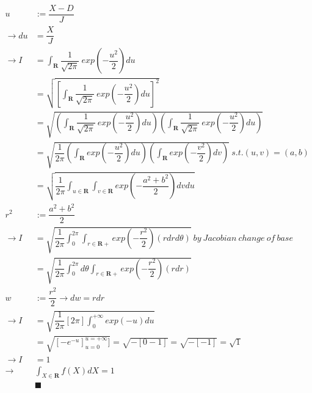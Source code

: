\documentclass[]{article}
\begin{document}
			\begin{align*}
				u &:= \dfrac{X-D}{J} \\
				\to du &= \dfrac{X}{J} \\
				\to I &=\int_\mathbf{R} \dfrac{1}{\sqrt{2\pi}}\ exp(-\dfrac{u^2}{2})du \\
				&= \sqrt{[\int_\mathbf{R} \dfrac{1}{\sqrt{2\pi}}\ exp(-\dfrac{u^2}{2})du]^2} \\
				&= \sqrt{(\int_\mathbf{R} \dfrac{1}{\sqrt{2\pi}}\ exp(-\dfrac{u^2}{2})du)(\int_\mathbf{R} \dfrac{1}{\sqrt{2\pi}}\ exp(-\dfrac{u^2}{2})du)} \\
				&= \sqrt{\dfrac{1}{2\pi}(\int_\mathbf{R}exp(-\dfrac{u^2}{2})du)(\int_\mathbf{R}exp(-\dfrac{v^2}{2})dv)}\ s.t. (u,v)=(a,b) \\
				&= \sqrt{\dfrac{1}{2\pi}\int_{u\in\mathbf{R}}\int_{v\in\mathbf{R}}exp(-\dfrac{a^2+b^2}{2})dvdu} \\
				r^2 &:= \dfrac{a^2+b^2}{2} \\
				\to I &= \sqrt{\dfrac{1}{2\pi}\int_0^{2\pi}\int_{r\in\mathbf{R}+}exp(-\dfrac{r^2}{2})(rdrd\theta)}\ by\ Jacobian\ change\ of\ base \\
				&= \sqrt{\dfrac{1}{2\pi}\int_0^{2\pi}d\theta \int_{r\in\mathbf{R}+}exp(-\dfrac{r^2}{2})(rdr)} \\
				w &:= \dfrac{r^2}{2} \to dw = rdr \\
				\to I &= \sqrt{\dfrac{1}{2\pi}[2\pi]\int_0^{+\infty} exp(-u)du} \\
				&= \sqrt{[-e^{-u}]_{u=0}^{u=+\infty}]}
				= \sqrt{-[0 - 1]} = \sqrt{-[-1]} = \sqrt{1} \\
				\to I &= 1 \\
				\to & \int_{X\in\mathbf{R}}f(X)dX = 1\\
				&\blacksquare
			\end{align*}
			
\end{document}

